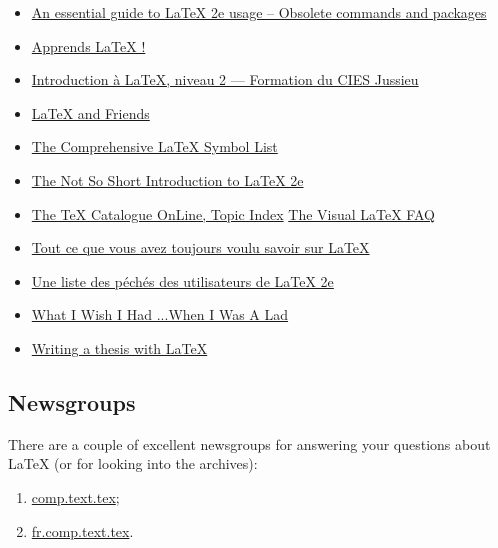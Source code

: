 \documentclass{mcreport}
\begin{document}
\begin{itemize}
    \item \href{http://www.ctan.org/tex-archive/info/l2tabu/}{An essential
    guide to LaTeX 2e usage -- Obsolete commands and packages}
    \item \href{http://tex.loria.fr/general/apprends-latex.pdf}{Apprends
    LaTeX !}
    \item \href{http://people.math.jussieu.fr/~mpg/latex/2007-niv2/pres-lvl2.pdf}
    {Introduction à LaTeX, niveau 2 --- Formation du CIES Jussieu}
    \item \href{http://csweb.ucc.ie/~dongen/LaTeX-and-Friends.pdf}{LaTeX and
    Friends}
    \item \href{%
    http://www.ctan.org/tex-archive/info/symbols/comprehensive/symbols-a4.pdf}
    {The Comprehensive LaTeX Symbol List}
    \item \href{http://tobi.oetiker.ch/lshort/lshort.pdf}{The Not So Short
    Introduction to LaTeX 2e}
    \item \href{http://mirror.ctan.org/help/Catalogue/bytopic.html}{The TeX
    Catalogue OnLine, Topic Index}
    \href{http://ctan.tug.org/tex-archive/info/visualFAQ/visualFAQ.pdf}{The
    Visual LaTeX FAQ}
    \item \href{http://cours.enise.fr/info/latex/}{Tout ce que vous avez
    toujours voulu savoir sur LaTeX}
    \item
    \href{http://www.lsv.ens-cachan.fr/~markey/LaTeX/doc/l2tabufr.pdf}{Une
    liste des péchés des utilisateurs de LaTeX 2e}
    \item
    \href{http://www.tug.org/pracjourn/2006-4/hefferon/hefferon.pdf}{What I
    Wish I Had ...When I Was A Lad}
    \item \href{http://www.tug.org/pracjourn/2008-1/mori/mori.pdf}{Writing a
    thesis with LaTeX}
\end{itemize}

\subsection{Newsgroups}
\label{sec:newsgroups}

There are a couple of excellent newsgroups for answering your questions
about \LaTeX{} (or for looking into the archives):

\begin{enumerate}
    \item \url{comp.text.tex};
    \item \url{fr.comp.text.tex}.
\end{enumerate}
\end{document}
